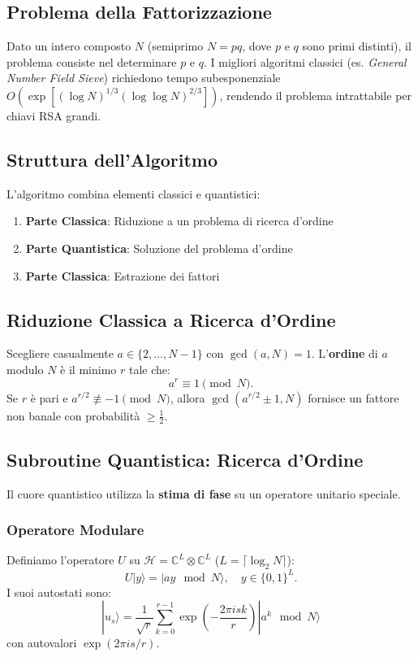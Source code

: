 \documentclass[a4paper,12pt]{report}
\theoremstyle{plain}
\begin{document}
\subsection{Problema della Fattorizzazione}
Dato un intero composto \(N\) (semiprimo \(N = pq\), dove \(p\) e \(q\) sono primi distinti), il problema consiste nel determinare \(p\) e \(q\). I migliori algoritmi classici (es. \textit{General Number Field Sieve}) richiedono tempo subesponenziale \(O\left(\exp\left[(\log N)^{1/3}(\log \log N)^{2/3}\right]\right)\), rendendo il problema intrattabile per chiavi RSA grandi.

\subsection{Struttura dell'Algoritmo}
L'algoritmo combina elementi classici e quantistici:

\begin{enumerate}
    \item \textbf{Parte Classica}: Riduzione a un problema di ricerca d'ordine
    \item \textbf{Parte Quantistica}: Soluzione del problema d'ordine
    \item \textbf{Parte Classica}: Estrazione dei fattori
\end{enumerate}

\subsection{Riduzione Classica a Ricerca d'Ordine}
Scegliere casualmente \(a \in \{2, \dots, N-1\}\) con \(\gcd(a, N) = 1\). L'\textbf{ordine} di \(a\) modulo \(N\) è il minimo \(r\) tale che:
\[
a^r \equiv 1 \pmod{N}.
\]
Se \(r\) è pari e \(a^{r/2} \not\equiv -1 \pmod{N}\), allora \(\gcd(a^{r/2} \pm 1, N)\) fornisce un fattore non banale con probabilità \(\geq \frac{1}{2}\).

\subsection{Subroutine Quantistica: Ricerca d'Ordine}
Il cuore quantistico utilizza la \textbf{stima di fase} su un operatore unitario speciale.

\subsubsection{Operatore Modulare}
Definiamo l'operatore \(U\) su \(\mathscr{H} = \mathbb{C}^L \otimes \mathbb{C}^L\) (\(L = \lceil \log_2 N \rceil\)):
\[
U|y\rangle = |a y \mod N\rangle, \quad y \in \{0,1\}^L.
\]
I suoi autostati sono:
\[
|u_s\rangle = \frac{1}{\sqrt{r}} \sum_{k=0}^{r-1} \exp\left(-\frac{2\pi i s k}{r}\right) |a^k \mod N\rangle
\]
con autovalori \(\exp(2\pi i s / r)\).
\end{document}
